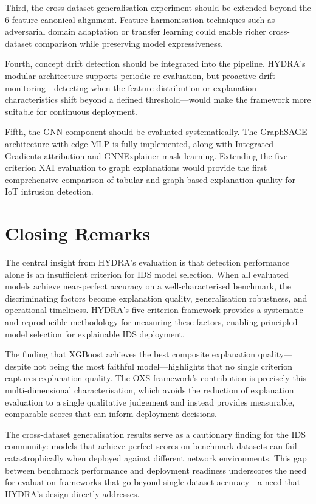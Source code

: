\documentclass[12pt,a4paper]{report}
\begin{document}
Third, the cross-dataset generalisation experiment should be extended beyond the 6-feature canonical alignment. Feature harmonisation techniques such as adversarial domain adaptation or transfer learning could enable richer cross-dataset comparison while preserving model expressiveness.

Fourth, concept drift detection should be integrated into the pipeline. HYDRA's modular architecture supports periodic re-evaluation, but proactive drift monitoring---detecting when the feature distribution or explanation characteristics shift beyond a defined threshold---would make the framework more suitable for continuous deployment.

Fifth, the GNN component should be evaluated systematically. The GraphSAGE architecture with edge MLP is fully implemented, along with Integrated Gradients attribution and GNNExplainer mask learning. Extending the five-criterion XAI evaluation to graph explanations would provide the first comprehensive comparison of tabular and graph-based explanation quality for IoT intrusion detection.

\section{Closing Remarks}
\label{sec:closing}

The central insight from HYDRA's evaluation is that detection performance alone is an insufficient criterion for IDS model selection. When all evaluated models achieve near-perfect accuracy on a well-characterised benchmark, the discriminating factors become explanation quality, generalisation robustness, and operational timeliness. HYDRA's five-criterion framework provides a systematic and reproducible methodology for measuring these factors, enabling principled model selection for explainable IDS deployment.

The finding that XGBoost achieves the best composite explanation quality---despite not being the most faithful model---highlights that no single criterion captures explanation quality. The OXS framework's contribution is precisely this multi-dimensional characterisation, which avoids the reduction of explanation evaluation to a single qualitative judgement and instead provides measurable, comparable scores that can inform deployment decisions.

The cross-dataset generalisation results serve as a cautionary finding for the IDS community: models that achieve perfect scores on benchmark datasets can fail catastrophically when deployed against different network environments. This gap between benchmark performance and deployment readiness underscores the need for evaluation frameworks that go beyond single-dataset accuracy---a need that HYDRA's design directly addresses.
\end{document}
